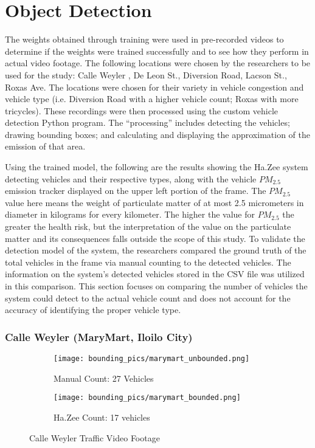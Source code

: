 \section{Object Detection}

The weights obtained through training were used in pre-recorded videos to determine if the weights were trained successfully and to see how they perform in actual video footage. The following locations were chosen by the researchers to be used for the study: Calle Weyler , De Leon St., Diversion Road, Lacson St., Roxas Ave. The locations were chosen for their variety in vehicle congestion and vehicle type (i.e. Diversion Road with a higher vehicle count; Roxas with more tricycles).  These recordings were then processed using the custom vehicle detection Python program. The “processing” includes detecting the vehicles; drawing bounding boxes; and calculating and displaying the approximation of the emission of that area. 

Using the trained model,  the following are the results showing the Ha.Zee system detecting vehicles and their respective types, along with the vehicle $PM_{2.5}$ emission tracker displayed on the upper left portion of the frame. The $PM_{2.5}$ value here means the weight of particulate matter of at most 2.5 micrometers in diameter in kilograms for every kilometer. The higher the value for $PM_{2.5}$ the greater the health risk, but the interpretation of the value on the particulate matter and its consequences falls outside the scope of this study.  To validate the detection model of the system, the researchers compared the ground truth of the total vehicles in the frame via manual counting to the detected vehicles. The information on the system’s detected vehicles stored in the CSV file was utilized in this comparison. This section focuses on comparing the number of vehicles the system could detect to the actual vehicle count and does not account for the accuracy of identifying the proper vehicle type.

\subsubsection{Calle Weyler (MaryMart, Iloilo City)}


\begin{figure}
	\begin{subfigure}{.5\textwidth}
		\centering
		\texttt{[image: bounding\_pics/marymart\_unbounded.png]}
		\caption{Manual Count: 27 Vehicles}
		
	\end{subfigure}%
	\begin{subfigure}{.5\textwidth}
		\centering
		\texttt{[image: bounding\_pics/marymart\_bounded.png]}
		\caption{Ha.Zee Count: 17 vehicles}
	\end{subfigure}
	\caption{Calle Weyler Traffic Video Footage}
\end{figure}

